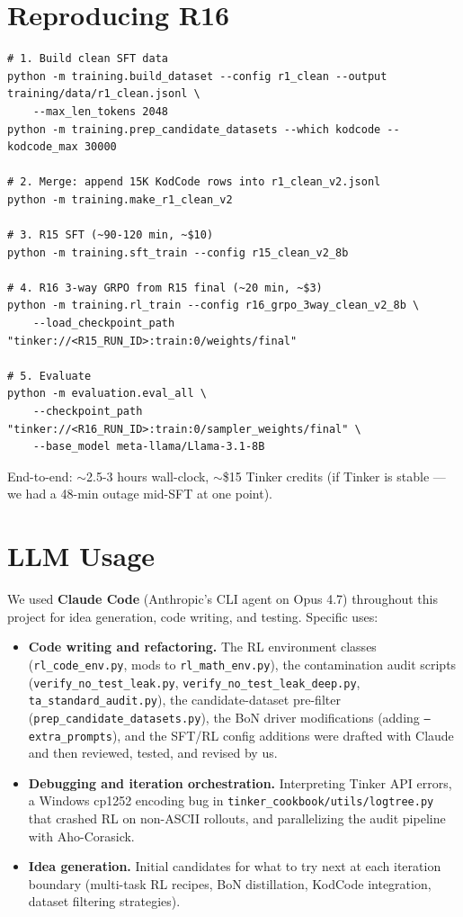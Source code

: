 \documentclass[11pt]{article}
\begin{document}
\section{Reproducing R16}

\begin{verbatim}
# 1. Build clean SFT data
python -m training.build_dataset --config r1_clean --output training/data/r1_clean.jsonl \
    --max_len_tokens 2048
python -m training.prep_candidate_datasets --which kodcode --kodcode_max 30000

# 2. Merge: append 15K KodCode rows into r1_clean_v2.jsonl
python -m training.make_r1_clean_v2

# 3. R15 SFT (~90-120 min, ~$10)
python -m training.sft_train --config r15_clean_v2_8b

# 4. R16 3-way GRPO from R15 final (~20 min, ~$3)
python -m training.rl_train --config r16_grpo_3way_clean_v2_8b \
    --load_checkpoint_path "tinker://<R15_RUN_ID>:train:0/weights/final"

# 5. Evaluate
python -m evaluation.eval_all \
    --checkpoint_path "tinker://<R16_RUN_ID>:train:0/sampler_weights/final" \
    --base_model meta-llama/Llama-3.1-8B
\end{verbatim}

End-to-end: $\sim$2.5-3 hours wall-clock, $\sim$\$15 Tinker credits (if Tinker is stable --- we had a 48-min outage mid-SFT at one point).

\clearpage
\section*{LLM Usage}

We used \textbf{Claude Code} (Anthropic's CLI agent on Opus 4.7) throughout this project for idea generation, code writing, and testing. Specific uses:

\begin{itemize}
\setlength\itemsep{-0.2em}
\item \textbf{Code writing and refactoring.} The RL environment classes (\texttt{rl\_code\_env.py}, mods to \texttt{rl\_math\_env.py}), the contamination audit scripts (\texttt{verify\_no\_test\_leak.py}, \texttt{verify\_no\_test\_leak\_deep.py}, \texttt{ta\_standard\_audit.py}), the candidate-dataset pre-filter (\texttt{prep\_candidate\_datasets.py}), the BoN driver modifications (adding \texttt{--extra\_prompts}), and the SFT/RL config additions were drafted with Claude and then reviewed, tested, and revised by us.
\item \textbf{Debugging and iteration orchestration.} Interpreting Tinker API errors, a Windows cp1252 encoding bug in \texttt{tinker\_cookbook/utils/logtree.py} that crashed RL on non-ASCII rollouts, and parallelizing the audit pipeline with Aho-Corasick.
\item \textbf{Idea generation.} Initial candidates for what to try next at each iteration boundary (multi-task RL recipes, BoN distillation, KodCode integration, dataset filtering strategies).
\end{itemize}
\end{document}
